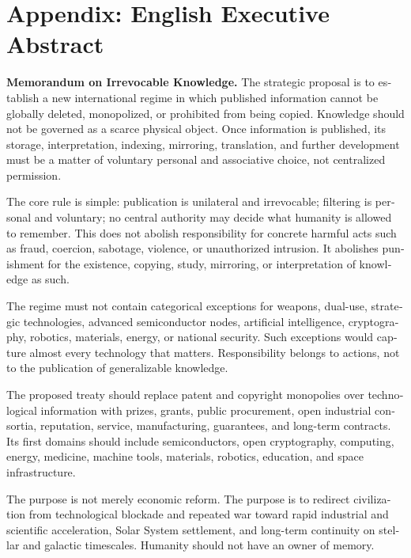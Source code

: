 \documentclass[11pt,a4paper]{article}
\begin{document}
\section*{Appendix: English Executive Abstract}
\begin{english}
\textbf{Memorandum on Irrevocable Knowledge.} The strategic proposal is to establish a new international regime in which published information cannot be globally deleted, monopolized, or prohibited from being copied. Knowledge should not be governed as a scarce physical object. Once information is published, its storage, interpretation, indexing, mirroring, translation, and further development must be a matter of voluntary personal and associative choice, not centralized permission.

The core rule is simple: publication is unilateral and irrevocable; filtering is personal and voluntary; no central authority may decide what humanity is allowed to remember. This does not abolish responsibility for concrete harmful acts such as fraud, coercion, sabotage, violence, or unauthorized intrusion. It abolishes punishment for the existence, copying, study, mirroring, or interpretation of knowledge as such.

The regime must not contain categorical exceptions for weapons, dual-use, strategic technologies, advanced semiconductor nodes, artificial intelligence, cryptography, robotics, materials, energy, or national security. Such exceptions would capture almost every technology that matters. Responsibility belongs to actions, not to the publication of generalizable knowledge.

The proposed treaty should replace patent and copyright monopolies over technological information with prizes, grants, public procurement, open industrial consortia, reputation, service, manufacturing, guarantees, and long-term contracts. Its first domains should include semiconductors, open cryptography, computing, energy, medicine, machine tools, materials, robotics, education, and space infrastructure.

The purpose is not merely economic reform. The purpose is to redirect civilization from technological blockade and repeated war toward rapid industrial and scientific acceleration, Solar System settlement, and long-term continuity on stellar and galactic timescales. Humanity should not have an owner of memory.
\end{english}
\end{document}

